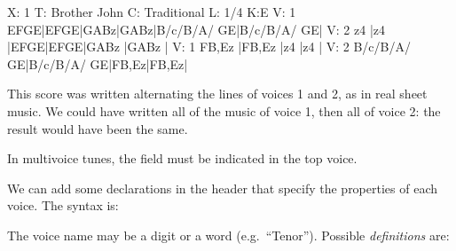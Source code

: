 \documentclass[a4paper,12pt]{book}
\begin{document}
\begin{abcsource}
X: 1
T: Brother John
C: Traditional
L: 1/4
K:E
V: 1
EFGE|EFGE|GABz|GABz|B/c/B/A/ GE|B/c/B/A/ GE|
V: 2
z4  |z4  |EFGE|EFGE|GABz       |GABz       |
V: 1
FB,Ez      |FB,Ez      |z4   |z4   |
V: 2
B/c/B/A/ GE|B/c/B/A/ GE|FB,Ez|FB,Ez|
\end{abcsource}


This score was written alternating the lines of voices 1 and 2, as in
real sheet music. We could have written all of the music of voice 1,
then all of voice 2: the result would have been the same.

\begin{warn}

  In multivoice tunes, the  field must be indicated in the
  top voice.

\end{warn}

We can add some declarations in the header that specify the properties
of each voice. The syntax is:

\medskip

   
   
 
 
 
 
 
  

\medskip

The voice name may be a digit or a word (e.g.\ ``Tenor''). Possible
\emph{definitions} are:
\end{document}
